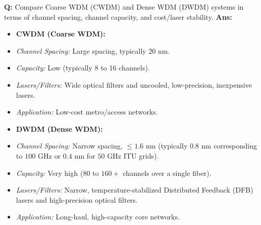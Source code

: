 \documentclass[10pt,a4paper,twocolumn]{article}
\begin{document}
\begin{tcolorbox}[
  colback=white,
  colframe=UnitColorFive,
  colbacktitle=gray!10!white,
  coltitle=black,
  fonttitle=\bfseries\sffamily\small,
  title={Unit V $\bullet$ Card 2: Coarse WDM vs. Dense WDM},
  boxrule=1.2pt,
  arc=2mm,
  outer arc=2mm,
  boxsep=1.5mm,
  top=1mm,
  bottom=1mm,
  left=1.5mm,
  right=1.5mm,
  before skip=2.5mm,
  after skip=2.5mm
]
\textbf{Q:} Compare Coarse WDM (CWDM) and Dense WDM (DWDM) systems in terms of channel spacing, channel capacity, and cost/laser stability.
\tcbline
\textbf{Ans:} \begin{itemize}
  \item   \textbf{CWDM (Coarse WDM):}
  \item   \textit{Channel Spacing:} Large spacing, typically $20\text{ nm}$.
  \item   \textit{Capacity:} Low (typically 8 to 16 channels).
  \item   \textit{Lasers/Filters:} Wide optical filters and uncooled, low-precision, inexpensive lasers.
  \item   \textit{Application:} Low-cost metro/access networks.
  \item   \textbf{DWDM (Dense WDM):}
  \item   \textit{Channel Spacing:} Narrow spacing, $\le 1.6\text{ nm}$ (typically $0.8\text{ nm}$ corresponding to $100\text{ GHz}$ or $0.4\text{ nm}$ for $50\text{ GHz}$ ITU grids).
  \item   \textit{Capacity:} Very high (80 to $160+$ channels over a single fiber).
  \item   \textit{Lasers/Filters:} Narrow, temperature-stabilized Distributed Feedback (DFB) lasers and high-precision optical filters.
  \item   \textit{Application:} Long-haul, high-capacity core networks.
\end{itemize}
\end{tcolorbox}
\end{document}
